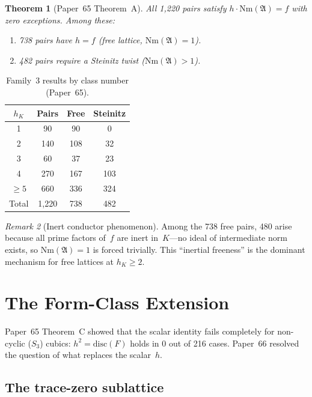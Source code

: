 \documentclass[11pt]{article}
\theoremstyle{plain}
\newtheorem{theorem}{Theorem}[section]
\theoremstyle{definition}
\theoremstyle{remark}
\newtheorem{remark}[theorem]{Remark}
\newcommand{\fA}{\mathfrak{A}}
\newcommand{\Nm}{\mathrm{Nm}}
\newcommand{\disc}{\mathrm{disc}}
\begin{document}
\begin{theorem}[Paper~65 Theorem~A]\label{thm:scale}
All 1{,}220 pairs satisfy $h \cdot \Nm(\fA) = f$ with zero
exceptions.  Among these:
\begin{enumerate}[label=(\roman*)]
\item 738 pairs have $h = f$ (free lattice, $\Nm(\fA) = 1$).
\item 482 pairs require a Steinitz twist ($\Nm(\fA) > 1$).
\end{enumerate}
\end{theorem}

\begin{table}[ht]
\centering
\caption{Family~3 results by class number
  (Paper~65).}\label{tab:scale}
\begin{tabular}{@{}cccc@{}}
\toprule
$h_K$ & Pairs & Free & Steinitz \\
\midrule
1 & 90 & 90 & 0 \\
2 & 140 & 108 & 32 \\
3 & 60 & 37 & 23 \\
4 & 270 & 167 & 103 \\
$\ge 5$ & 660 & 336 & 324 \\
\midrule
Total & 1{,}220 & 738 & 482 \\
\bottomrule
\end{tabular}
\end{table}

\begin{remark}[Inert conductor phenomenon]
Among the 738 free pairs, 480 arise because all prime factors
of~$f$ are inert in~$K$---no ideal of intermediate norm exists,
so $\Nm(\fA) = 1$ is forced trivially.  This ``inertial
freeness'' is the dominant mechanism for free lattices at
$h_K \ge 2$.
\end{remark}


\section{The Form-Class Extension}\label{sec:formclass}

Paper~65 Theorem~C showed that the scalar identity fails
completely for non-cyclic ($S_3$) cubics: $h^2 = \disc(F)$ holds
in 0 out of 216 cases.  Paper~66 \cite{Paper66} resolved the
question of what replaces the scalar~$h$.

\subsection{The trace-zero sublattice}
\end{document}
